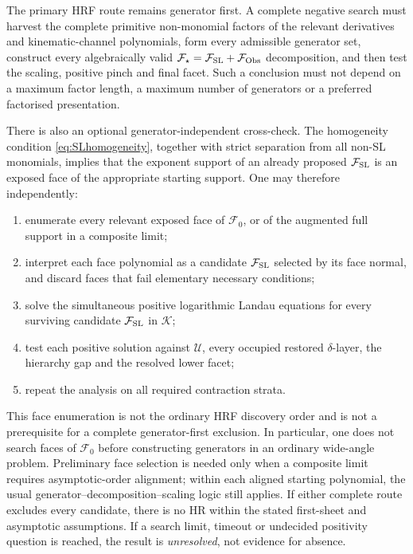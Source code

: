 \documentclass[a4paper,11pt]{article}
\newcommand{\K}{\mathcal K}
\newcommand{\FSL}{\mathcal F_{\rm SL}}
\newcommand{\FObs}{\mathcal F_{\rm Obs}}
\begin{document}
The primary HRF route remains generator first.  A complete negative search
must harvest the complete primitive non-monomial factors of the relevant
derivatives and kinematic-channel polynomials, form every admissible generator
set, construct every algebraically valid
\(\mathcal F_\star=\FSL+\FObs\) decomposition, and then test the scaling,
positive pinch and final facet.  Such a conclusion must not depend on a
maximum factor length, a maximum number of generators or a preferred
factorised presentation.

There is also an optional generator-independent cross-check.  The homogeneity
condition \eqref{eq:SLhomogeneity}, together with strict separation from all
non-SL monomials, implies that the exponent support of an already proposed
\(\FSL\) is an exposed face of the appropriate starting support.  One may
therefore independently:
\begin{enumerate}[label=\arabic*.]
\item enumerate every relevant exposed face of \(\mathcal F_0\), or of the
      augmented full support in a composite limit;
\item interpret each face polynomial as a candidate \(\FSL\) selected by
      its face normal, and discard faces that fail elementary necessary
      conditions;
\item solve the simultaneous positive logarithmic Landau equations for every
      surviving candidate \(\FSL\) in \(\K\);
\item test each positive solution against \(\mathcal U\), every occupied
      restored \(\delta\)-layer, the hierarchy gap and the resolved lower
      facet;
\item repeat the analysis on all required contraction strata.
\end{enumerate}

This face enumeration is not the ordinary HRF discovery order and is not a
prerequisite for a complete generator-first exclusion.  In particular, one
does not search faces of \(\mathcal F_0\) before constructing generators in
an ordinary wide-angle problem.  Preliminary face selection is needed only
when a composite limit requires asymptotic-order alignment; within each
aligned starting polynomial, the usual generator--decomposition--scaling
logic still applies.  If either complete route excludes every candidate, there
is no HR within the stated first-sheet and asymptotic assumptions.  If a
search limit, timeout or undecided positivity question is reached, the result
is \emph{unresolved}, not evidence for absence.
\end{document}
